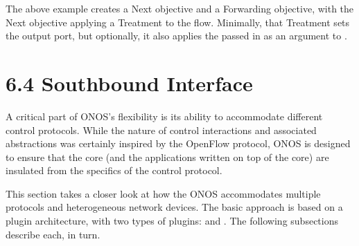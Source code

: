 \documentclass[letterpaper,11pt,english]{sphinxmanual}
\begin{document}
\begin{sphinxVerbatim}[commandchars=\\\{\}]
\end{sphinxVerbatim}

The above example creates a Next objective and a Forwarding objective,
with the Next objective applying a Treatment to the flow. Minimally,
that Treatment sets the output port, but optionally, it also applies
the  passed in as an argument to .


\section{6.4 Southbound Interface}
\label{\detokenize{onos:southbound-interface}}
A critical part of ONOS’s flexibility is its ability to accommodate
different control protocols. While the nature of control interactions
and associated abstractions was certainly inspired by the OpenFlow
protocol, ONOS is designed to ensure that the core (and the
applications written on top of the core) are insulated from the
specifics of the control protocol.

This section takes a closer look at how the ONOS accommodates multiple
protocols and heterogeneous network devices. The basic approach is
based on a plugin architecture, with two types of plugins:  and . The following subsections describe
each, in turn.
\end{document}
